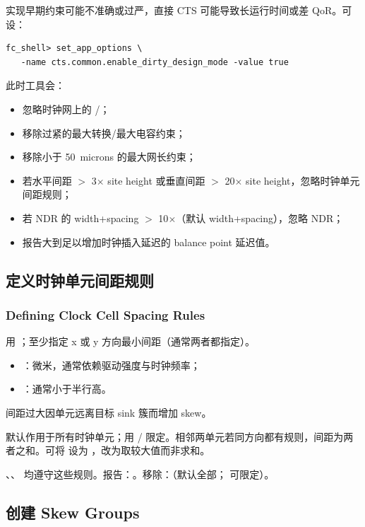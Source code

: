 实现早期约束可能不准确或过严，直接 CTS 可能导致长运行时间或差 QoR。可设：
\begin{lstlisting}
fc_shell> set_app_options \
   -name cts.common.enable_dirty_design_mode -value true
\end{lstlisting}
此时工具会：
\begin{itemize}
  \item 忽略时钟网上的 /；
  \item 移除过紧的最大转换/最大电容约束；
  \item 移除小于 50~microns 的最大网长约束；
  \item 若水平间距 $>$ 3$\times$ site height 或垂直间距 $>$ 20$\times$ site height，忽略时钟单元间距规则；
  \item 若 NDR 的 width+spacing $>$ 10$\times$（默认 width+spacing），忽略 NDR；
  \item 报告大到足以增加时钟插入延迟的 balance point 延迟值。
\end{itemize}

\subsection{定义时钟单元间距规则}
\subsubsection*{Defining Clock Cell Spacing Rules}

用 ；至少指定 x 或 y 方向最小间距（通常两者都指定）。
\begin{itemize}
  \item {}：微米，通常依赖驱动强度与时钟频率；
  \item {}：通常小于半行高。
\end{itemize}
\begin{noteBox}
间距过大因单元远离目标 sink 簇而增加 skew。
\end{noteBox}
默认作用于所有时钟单元；用 / 限定。相邻两单元若同方向都有规则，间距为两者之和。可将  设为 ，改为取较大值而非求和。

、、 均遵守这些规则。报告：。移除：（默认全部； 可限定）。

\subsection{创建 Skew Groups}
